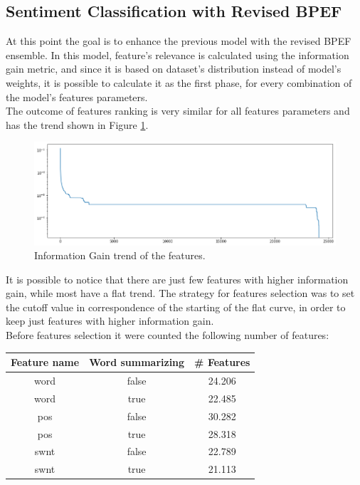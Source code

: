 \subsection{Sentiment Classification with Revised BPEF}

At this point the goal is to enhance the previous model with the revised BPEF ensemble. In this model, feature's relevance is calculated using the information gain metric, and since it is based on dataset's distribution instead of model's weights, it is possible to calculate it as the first phase, for every combination of the model's features parameters.\\
The outcome of features ranking is very similar for all features parameters and has the trend shown in Figure \ref{fig:twitter_bpef_fs_1}.

\begin{figure}[H]
	\centering
	\includegraphics[width=\textwidth]{figures/conf_matrices/twitter_snt_bpef/bpef_fs_1.png}
	\caption{Information Gain trend of the features.}
	\label{fig:twitter_bpef_fs_1}
\end{figure}

It is possible to notice that there are just few features with higher information gain, while most have a flat trend. The strategy for features selection was to set the cutoff value in correspondence of the starting of the flat curve, in order to keep just features with higher information gain.\\
Before features selection it were counted the following number of features:

\begin{center}
	\begin{tabular}{ c  c  c } 
		\hline
		\textbf{Feature name} & \textbf{Word summarizing} & \textbf{\# Features} \\
		\hline
		word & false & 24.206 \\ 
		\hline
		word & true & 22.485 \\ 
		\hline
		pos & false & 30.282 \\ 
		\hline
		pos & true & 28.318 \\ 
		\hline
		swnt & false & 22.789 \\ 
		\hline
		swnt & true & 21.113 \\ 
		\hline
	\end{tabular}
\end{center}

